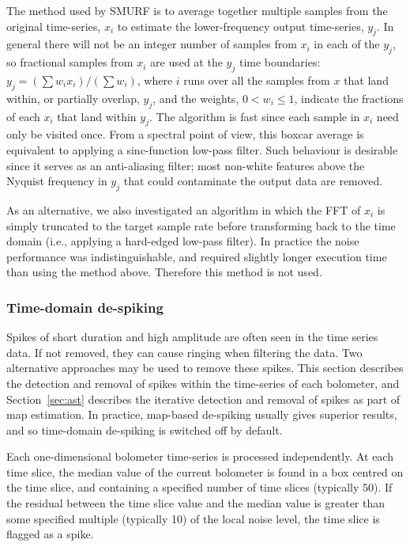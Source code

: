 \documentclass[useAMS,usenatbib,nofootinbib]{mn2e}
\begin{document}
The method used by SMURF is to average together multiple samples from
the original time-series, $x_i$ to estimate the lower-frequency output
time-series, $y_j$. In general there will not be an integer number of
samples from $x_i$ in each of the $y_j$, so fractional samples from
$x_i$ are used at the $y_j$ time boundaries: $y_j = (\sum w_i
x_i)/(\sum w_i)$, where $i$ runs over all the samples from $x$ that
land within, or partially overlap, $y_j$, and the weights,
$0<w_i\le1$, indicate the fractions of each $x_i$ that land within
$y_j$. The algorithm is fast since each sample in $x_i$ need only be
visited once. From a spectral point of view, this boxcar average is
equivalent to applying a sinc-function low-pass filter. Such behaviour
is desirable since it serves as an anti-aliasing filter; most
non-white features above the Nyquist frequency in $y_j$ that could
contaminate the output data are removed.

As an alternative, we also investigated an algorithm in which the FFT
of $x_i$ is simply truncated to the target sample rate before
transforming back to the time domain (i.e., applying a hard-edged
low-pass filter). In practice the noise performance was
indistinguishable, and required slightly longer execution time than using
the method above. Therefore this method is not used.

\subsubsection{Time-domain de-spiking}
\label{sec:timedespike}

Spikes of short duration and high amplitude are often seen in the time
series data. If not removed, they can cause ringing when filtering the
data. Two alternative approaches may be used to remove these
spikes. This section describes the detection and removal of spikes
within the time-series of each bolometer, and Section~\ref{sec:ast}
describes the iterative detection and removal of spikes as part of map
estimation. In practice, map-based de-spiking usually gives superior
results, and so time-domain de-spiking is switched off by default.

Each one-dimensional bolometer time-series is processed
independently. At each time slice, the median value of the current
bolometer is found in a box centred on the time slice, and containing
a specified number of time slices (typically 50). If the residual
between the time slice value and the median value is greater than some
specified multiple (typically 10) of the local noise level, the time
slice is flagged as a spike.
\end{document}
